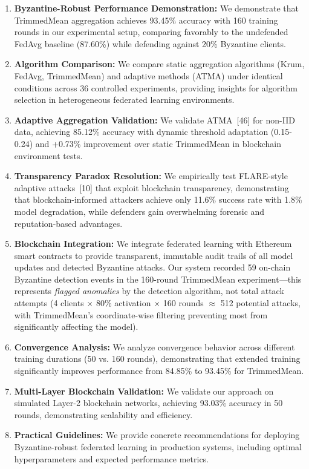 \documentclass[12pt,a4paper,onecolumn]{article}
\begin{document}
\begin{enumerate}
    \item \textbf{Byzantine-Robust Performance Demonstration:} We demonstrate that TrimmedMean aggregation achieves 93.45\% accuracy with 160 training rounds in our experimental setup, comparing favorably to the undefended FedAvg baseline (87.60\%) while defending against 20\% Byzantine clients.
    
    \item \textbf{Algorithm Comparison:} We compare static aggregation algorithms (Krum, FedAvg, TrimmedMean) and adaptive methods (ATMA) under identical conditions across 36 controlled experiments, providing insights for algorithm selection in heterogeneous federated learning environments.
    
    \item \textbf{Adaptive Aggregation Validation:} We validate ATMA~[46] for non-IID data, achieving 85.12\% accuracy with dynamic threshold adaptation (0.15-0.24) and +0.73\% improvement over static TrimmedMean in blockchain environment tests.
    
    \item \textbf{Transparency Paradox Resolution:} We empirically test FLARE-style adaptive attacks~[10] that exploit blockchain transparency, demonstrating that blockchain-informed attackers achieve only 11.6\% success rate with 1.8\% model degradation, while defenders gain overwhelming forensic and reputation-based advantages.
    
    \item \textbf{Blockchain Integration:} We integrate federated learning with Ethereum smart contracts to provide transparent, immutable audit trails of all model updates and detected Byzantine attacks. Our system recorded 59 on-chain Byzantine detection events in the 160-round TrimmedMean experiment---this represents \emph{flagged anomalies} by the detection algorithm, not total attack attempts (4 clients $\times$ 80\% activation $\times$ 160 rounds $\approx$ 512 potential attacks, with TrimmedMean's coordinate-wise filtering preventing most from significantly affecting the model).
    
    \item \textbf{Convergence Analysis:} We analyze convergence behavior across different training durations (50 vs. 160 rounds), demonstrating that extended training significantly improves performance from 84.85\% to 93.45\% for TrimmedMean.
    
    \item \textbf{Multi-Layer Blockchain Validation:} We validate our approach on simulated Layer-2 blockchain networks, achieving 93.03\% accuracy in 50 rounds, demonstrating scalability and efficiency.
    
    \item \textbf{Practical Guidelines:} We provide concrete recommendations for deploying Byzantine-robust federated learning in production systems, including optimal hyperparameters and expected performance metrics.
\end{enumerate}
\end{document}
